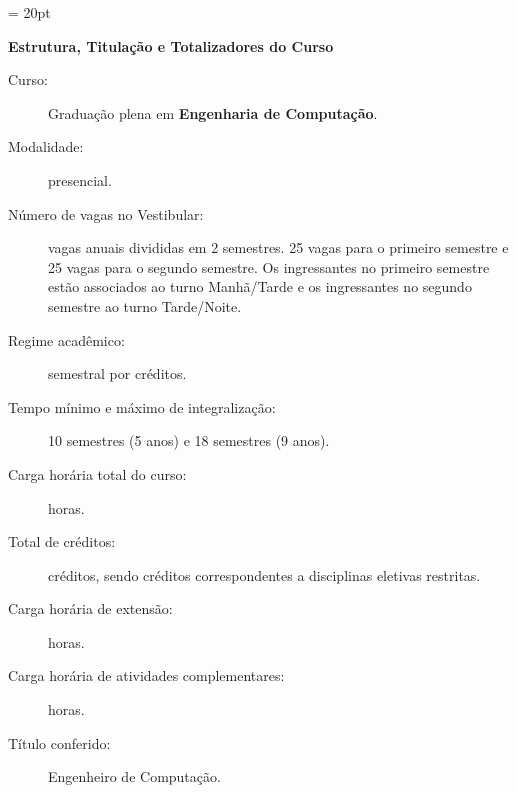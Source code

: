\documentclass[oneside,envcountsame,envcountchap,openany]{svmono}
\begin{document}
\thispagestyle{firstpage} %
\headsep = 20pt
\setlength{\tabcolsep}{5pt} %
\vspace*{2.0cm}

\pagestyle{plain} %

\begin{center}
  \textbf{\LARGE Estrutura, Titulação e Totalizadores do Curso}
\end{center}
\vspace*{0.5cm}

\begin{description}
  \item [Curso:] Graduação plena em \textbf{Engenharia de Computação}.
  \item [Modalidade:] presencial.
  \item [Número de vagas no Vestibular:] \vagas vagas anuais divididas em 2 semestres. 25 vagas para o primeiro semestre e 25 vagas para o segundo semestre. Os ingressantes no primeiro semestre estão associados ao turno Manhã/Tarde e os ingressantes no segundo semestre ao turno Tarde/Noite.
  \item [Regime acadêmico:] semestral por créditos.
  \item [Tempo mínimo e máximo de integralização:] 10 semestres (5 anos) e 18 semestres (9 anos).
  \item [Carga horária total do curso:] \tHorasCurso horas.
  \item [Total de créditos:] \tCredCurso créditos, sendo \credEletivas créditos correspondentes a disciplinas eletivas restritas.
  \item [Carga horária de extensão:] \hExtensao horas.
  \item [Carga horária de atividades complementares:] \hACC horas.
  \item [Título conferido:] Engenheiro de Computação.

\end{description}
\end{document}
